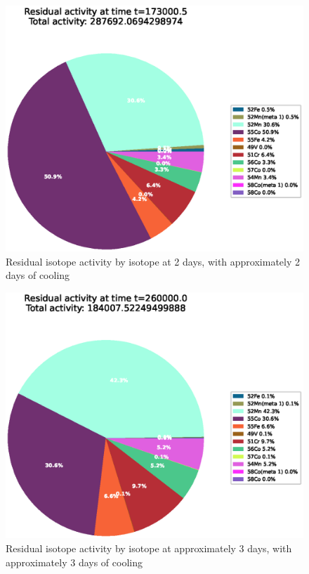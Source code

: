 \begin{figure}[!htb]
\centering
\includegraphics[width=0.8\linewidth]{chapters/activity_code/fe-activity-v2/residual-activity/0233_173000.eps}
\caption{Residual isotope activity by isotope at 2 days, with approximately 2 days of cooling}
\label{fig:activity-v2-residual-activity-173000s}
\end{figure}

\begin{figure}[!htb]
\centering
\includegraphics[width=0.8\linewidth]{chapters/activity_code/fe-activity-v2/residual-activity/0300_260000.eps}
\caption{Residual isotope activity by isotope at approximately 3 days, with approximately 3 days of cooling}
\label{fig:activity-v2-residual-activity-260000s}
\end{figure}



\clearpage

